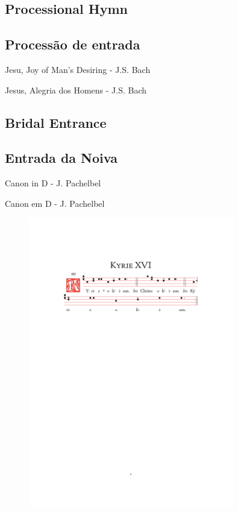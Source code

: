 \documentclass[10pt,a5]{article}
\newcommand \subsect[2] {\subsection*{#1} \switchcolumn \subsection*{#2} \switchcolumn*}
\begin{document}
\begin{paracol}{2}
	\subsect{Processional Hymn}{Process\~ao de entrada}

	\hspace*{2em} Jesu, Joy of Man's Desiring - J.S. Bach

	\switchcolumn

	\hspace*{2em} Jesus, Alegria dos Homens - J.S. Bach

	\switchcolumn*

	\subsect{Bridal Entrance}{Entrada da Noiva}

	\hspace*{2em} Canon in D - J. Pachelbel

	\switchcolumn

	\hspace*{2em} Canon em D - J. Pachelbel

	\switchcolumn*

\end{paracol}

\begin{figure}[h]
	\centering
	\includegraphics[trim = 35mm 200mm 35.5mm 35mm, clip, width = 0.8\textwidth]{scores/Kyrie-XVI.pdf}
\end{figure}
\end{document}

